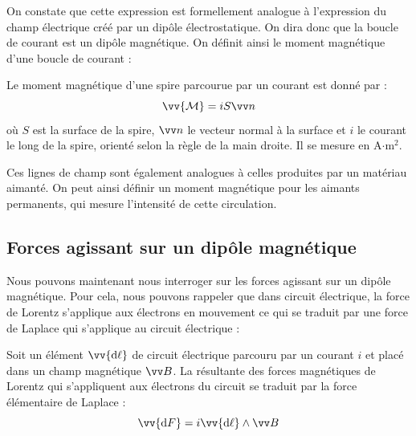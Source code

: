 \documentclass[11pt,fleqn]{book} %
\newcommand{\dd}{\mathrm{d}}
\begin{document}
On constate que cette expression est formellement analogue à l'expression du champ électrique créé par un dipôle électrostatique. On dira donc que la boucle de courant est un dipôle magnétique. On définit ainsi le moment magnétique d'une boucle de courant :
\begin{proposition}
    Le moment magnétique d'une spire parcourue par un courant est donné par :
    \begin{equation}
    \vv{\mathcal{M}} = i S \vv n
    \end{equation}
    où $S$ est la surface de la spire, $\vv n$ le vecteur normal à la surface et $i$ le courant le long de la spire, orienté selon la règle de la main droite. Il se mesure en A$\cdot$m$^2$.
\end{proposition}

Ces lignes de champ sont également analogues à celles produites par un matériau aimanté. On peut ainsi définir un moment magnétique pour les aimants permanents, qui mesure l'intensité de cette circulation.

\subsection{Forces agissant sur un dipôle magnétique}

Nous pouvons maintenant nous interroger sur les forces agissant sur un dipôle magnétique. Pour cela, nous pouvons rappeler que dans circuit électrique, la force de Lorentz s'applique aux électrons en mouvement ce qui se traduit par une force de Laplace qui s'applique au circuit électrique :
\begin{proposition}
    Soit un élément $\vv{\dd \ell}$ de circuit électrique parcouru par un courant $i$ et placé dans un champ magnétique $\vv B$. La résultante des forces magnétiques de Lorentz qui s'appliquent aux électrons du circuit se traduit par la force élémentaire de Laplace :
    \begin{equation}
        \vv{\dd F} = i \vv{\dd \ell} \wedge \vv B
    \end{equation}
\end{proposition}
\end{document}
